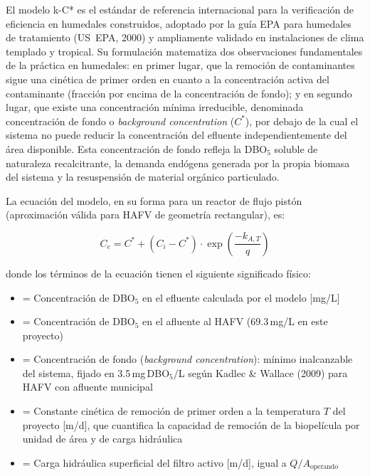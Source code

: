\documentclass[12pt,a4paper]{article}
\begin{document}
El modelo k-C* es el estándar de referencia internacional para la verificación de eficiencia en humedales construidos, adoptado por la guía EPA para humedales de tratamiento (US~EPA, 2000) y ampliamente validado en instalaciones de clima templado y tropical. Su formulación matematiza dos observaciones fundamentales de la práctica en humedales: en primer lugar, que la remoción de contaminantes sigue una cinética de primer orden en cuanto a la concentración activa del contaminante (fracción por encima de la concentración de fondo); y en segundo lugar, que existe una concentración mínima irreducible, denominada concentración de fondo o \textit{background concentration} ($C^*$), por debajo de la cual el sistema no puede reducir la concentración del efluente independientemente del área disponible. Esta concentración de fondo refleja la DBO$_5$ soluble de naturaleza recalcitrante, la demanda endógena generada por la propia biomasa del sistema y la resuspensión de material orgánico particulado.

La ecuación del modelo, en su forma para un reactor de flujo pistón (aproximación válida para HAFV de geometría rectangular), es:

\begin{equation}
C_e = C^* + (C_i - C^*) \cdot \exp\!\left(\frac{-k_{A,T}}{q}\right)
\label{eq:kC_star}
\end{equation}

donde los términos de la ecuación tienen el siguiente significado físico:

\begin{itemize}[noitemsep,leftmargin=2em]
    \item[$C_e$] = Concentración de DBO$_5$ en el efluente calculada por el modelo [mg/L]
    \item[$C_i$] = Concentración de DBO$_5$ en el afluente al HAFV (69.3\,mg/L en este proyecto)
    \item[$C^*$] = Concentración de fondo (\textit{background concentration}): mínimo inalcanzable del sistema, fijado en 3.5\,mg\,DBO$_5$/L según Kadlec \& Wallace (2009) para HAFV con afluente municipal
    \item[$k_{A,T}$] = Constante cinética de remoción de primer orden a la temperatura $T$ del proyecto [m/d], que cuantifica la capacidad de remoción de la biopelícula por unidad de área y de carga hidráulica
    \item[$q$] = Carga hidráulica superficial del filtro activo [m/d], igual a $Q / A_\text{operando}$
\end{itemize}
\end{document}
